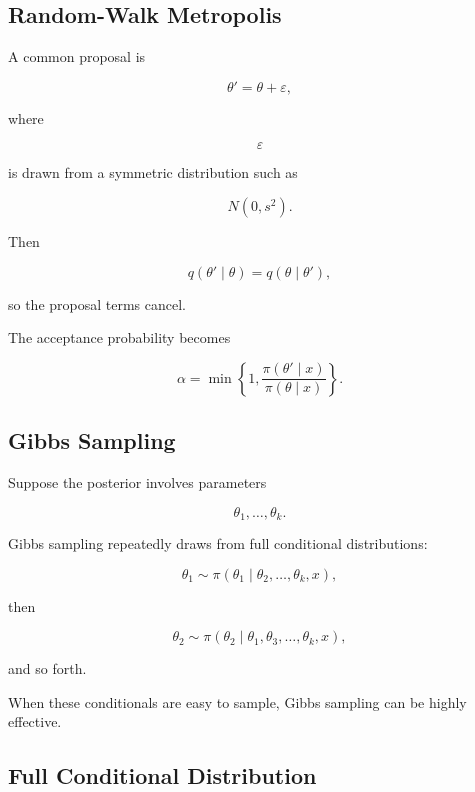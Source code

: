 \subsection{Random-Walk Metropolis}
\label{subsec:random-walk-metropolis}

A common proposal is

\[
\boxed{
\theta'
=
\theta+\varepsilon,
}
\]

where

\[
\varepsilon
\]

is drawn from a symmetric distribution such as

\[
N(0,s^2).
\]

Then

\[
q(\theta'\mid\theta)
=
q(\theta\mid\theta'),
\]

so the proposal terms cancel.

The acceptance probability becomes

\[
\boxed{
\alpha
=
\min
\left\{
1,
\frac{
\pi(\theta'\mid x)
}{
\pi(\theta\mid x)
}
\right\}.
}
\]

\subsection{Gibbs Sampling}
\label{subsec:gibbs-sampling}

Suppose the posterior involves parameters

\[
\theta_1,\ldots,\theta_k.
\]

Gibbs sampling repeatedly draws from full conditional distributions:

\[
\boxed{
\theta_1
\sim
\pi
(
\theta_1
\mid
\theta_2,\ldots,\theta_k,x
),
}
\]

then

\[
\boxed{
\theta_2
\sim
\pi
(
\theta_2
\mid
\theta_1,\theta_3,\ldots,\theta_k,x
),
}
\]

and so forth.

When these conditionals are easy to sample, Gibbs sampling can be highly
effective.

\subsection{Full Conditional Distribution}
\label{subsec:full-conditional-distribution}

